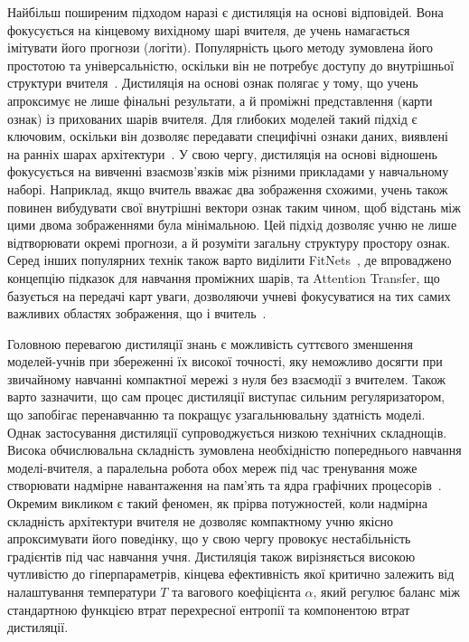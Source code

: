 \documentclass{pma-mthesis}
\begin{document}
Найбільш поширеним підходом наразі є дистиляція на основі відповідей. Вона фокусується на кінцевому вихідному шарі вчителя, де учень намагається імітувати його прогнози (логіти). Популярність цього методу зумовлена його простотою та універсальністю, оскільки він не потребує доступу до внутрішньої структури вчителя~\cite{gou2021knowledge}. Дистиляція на основі ознак полягає у тому, що учень апроксимує не лише фінальні результати, а й проміжні представлення (карти ознак) із прихованих шарів вчителя. Для глибоких моделей такий підхід є ключовим, оскільки він дозволяє передавати специфічні ознаки даних, виявлені на ранніх шарах архітектури~\cite{gou2021knowledge}. У свою чергу, дистиляція на основі відношень фокусується на вивченні взаємозв'язків між різними прикладами у навчальному наборі. Наприклад, якщо вчитель вважає два зображення схожими, учень також повинен вибудувати свої внутрішні вектори ознак таким чином, щоб відстань між цими двома зображеннями була мінімальною. Цей підхід дозволяє учню не лише відтворювати окремі прогнози, а й розуміти загальну структуру простору ознак. Серед інших популярних технік також варто виділити FitNets~\cite{Romero15-iclr}, де впроваджено концепцію підказок для навчання проміжних шарів, та Attention Transfer, що базується на передачі карт уваги, дозволяючи учневі фокусуватися на тих самих важливих областях зображення, що і вчитель~\cite{Zagoruyko2017AT}.

Головною перевагою дистиляції знань є можливість суттєвого зменшення моделей-учнів при збереженні їх високої точності, яку неможливо досягти при звичайному навчанні компактної мережі з нуля без взаємодії з вчителем. Також варто зазначити, що сам процес дистиляції виступає сильним регуляризатором, що запобігає перенавчанню та покращує узагальнювальну здатність моделі. Однак застосування дистиляції супроводжується низкою технічних складнощів. Висока обчислювальна складність зумовлена необхідністю попереднього навчання моделі-вчителя, а паралельна робота обох мереж під час тренування може створювати надмірне навантаження на пам'ять та ядра графічних процесорів~\cite{gou2021knowledge}. Окремим викликом є такий феномен, як прірва потужностей, коли надмірна складність архітектури вчителя не дозволяє компактному учню якісно апроксимувати його поведінку, що у свою чергу провокує нестабільність градієнтів під час навчання учня. Дистиляція також вирізняється високою чутливістю до гіперпараметрів, кінцева ефективність якої критично залежить від налаштування температури $T$ та вагового коефіцієнта $\alpha$, який регулює баланс між стандартною функцією втрат перехресної ентропії та компонентою втрат дистиляції.
\end{document}

